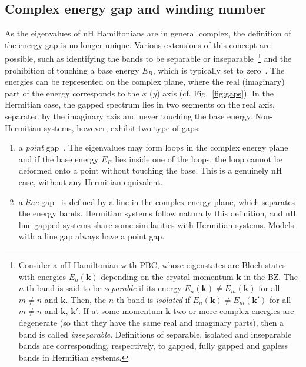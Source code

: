 \subsection{Complex energy gap and winding number}
As the eigenvalues of nH Hamiltonians are in general complex, the definition of the energy gap is no longer unique. Various extensions of this concept are possible, such as identifying the bands to be separable or inseparable~\cite{PhysRevLett.120.146402}\footnote{Consider a nH Hamiltonian with PBC, whose eigenstates are Bloch states with energies $E_n( \mathbf{k} )$ depending on the crystal momentum $\mathbf{k}$ in the BZ. The $n$-th band is said to be \emph{separable} if its energy $E_n (\mathbf{k}) \neq E_m (\mathbf{k})$ for all $m \neq n$ and $\mathbf{k}$. Then, the $n$-th band is \emph{isolated} if $E_n (\mathbf{k}) \neq E_m (\mathbf{k'})$ for all $m \neq n$ and $\mathbf{k}, \, \mathbf{k'}$. If at some momentum $\mathbf{k}$ two or more complex energies are degenerate (so that they have the same real and imaginary parts), then a band is called \emph{inseparable}. Definitions of separable, isolated and inseparable bands are corresponding, respectively, to gapped, fully gapped and gapless bands in Hermitian systems.} and the prohibition of touching a base energy $E_B$, which is typically set to zero~\cite{PhysRevX.8.031079}. The energies can be represented on the complex plane, where the real (imaginary) part of the energy corresponds to the $x$ ($y$) axis (cf. Fig.~\ref{fig:gaps}). In the Hermitian case, the gapped spectrum lies in two segments on the real axis, separated by the imaginary axis and never touching the base energy. Non-Hermitian systems, however, exhibit two type of gaps:

\begin{enumerate}[label=\textbf{\arabic*.}]
\item a \emph{point} gap~\cite{PhysRevX.8.031079}. The eigenvalues may form loops in the complex energy plane and if the base energy $E_B$ lies inside one of the loops, the loop cannot be deformed onto a point without touching the base. This is a genuinely nH case, without any Hermitian equivalent.
\item a \emph{line} gap~\cite{PhysRevX.9.041015, BorgniaCitationRequest} is defined by a line in the complex energy plane, which separates the energy bands. Hermitian systems follow naturally this definition, and nH line-gapped systems share some similarities with Hermitian systems. Models with a line gap always have a point gap.
\end{enumerate}

